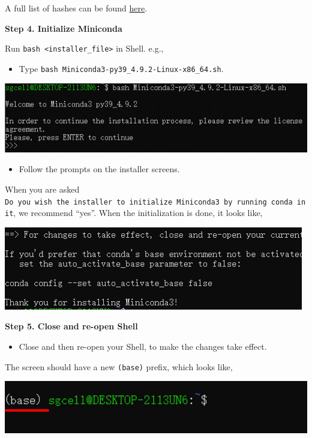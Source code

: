 \documentclass[
]{book}
\providecommand{\tightlist}{%
  \setlength{\itemsep}{0pt}\setlength{\parskip}{0pt}}
\begin{document}
A full list of hashes can be found \href{https://docs.conda.io/en/latest/miniconda.html}{here}.

\textbf{Step 4. Initialize Miniconda}

Run \texttt{bash\ \textless{}installer\_file\textgreater{}} in Shell. e.g.,

\begin{itemize}
\tightlist
\item
  Type \texttt{bash\ Miniconda3-py39\_4.9.2-Linux-x86\_64.sh}.
\end{itemize}

\begin{center}\includegraphics[width=0.55\linewidth]{./images/conda_init_conda} \end{center}

\begin{itemize}
\tightlist
\item
  Follow the prompts on the installer screens.
\end{itemize}

When you are asked \texttt{Do\ you\ wish\ the\ installer\ to\ initialize\ Miniconda3\ by\ running\ conda\ init}, we recommend ``yes''. When the initialization is done, it looks like,

\begin{center}\includegraphics[width=0.45\linewidth]{./images/conda_init_conda2} \end{center}

\textbf{Step 5. Close and re-open Shell}

\begin{itemize}
\tightlist
\item
  Close and then re-open your Shell, to make the changes take effect.
\end{itemize}

The screen should have a new \texttt{(base)} prefix, which looks like,

\begin{center}\includegraphics[width=0.4\linewidth]{./images/conda_reopen_shell} \end{center}
\end{document}
